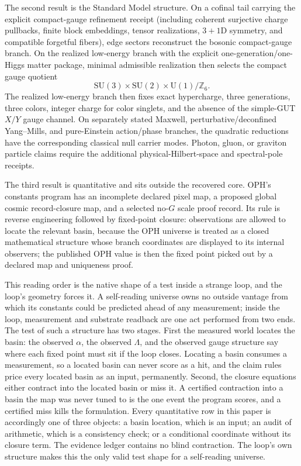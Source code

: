 \documentclass[11pt]{article}
\newcommand{\SU}{\mathrm{SU}}
\newcommand{\U}{\mathrm{U}}
\begin{document}
The second result is the Standard Model structure. On a cofinal tail carrying the explicit
compact-gauge refinement receipt (including coherent surjective charge pullbacks, finite block
embeddings, tensor realizations, \(3+1\)D symmetry, and compatible forgetful fibers), edge sectors reconstruct the
bosonic compact-gauge branch. On the realized low-energy branch with the explicit
one-generation/one-Higgs matter package, minimal admissible realization then selects the
compact gauge quotient
\[
\SU(3)\times\SU(2)\times\U(1)/\mathbb Z_6.
\]
The realized low-energy branch then fixes exact hypercharge, three generations, three colors,
integer charge for color singlets, and the absence of the simple-GUT \(X/Y\)
gauge channel. On separately
stated Maxwell, perturbative/deconfined Yang--Mills, and pure-Einstein action/phase branches, the
quadratic reductions have the corresponding classical null carrier modes. Photon, gluon, or
graviton particle claims require the additional physical-Hilbert-space and spectral-pole receipts.

The third result is quantitative and sits outside the recovered core. OPH's constants program
has an incomplete declared pixel map, a proposed global cosmic record-closure map, and a selected
no-\(G\) scale proof record. Its rule is reverse
engineering followed by fixed-point closure: observations are allowed to locate the relevant basin,
because the OPH universe is treated as a closed mathematical structure whose branch coordinates are
displayed to its internal observers; the published OPH value is then the fixed point picked
out by a declared map and uniqueness proof.

This reading order is the native shape of a test inside a strange loop, and the loop's geometry
forces it. A self-reading universe owns no outside vantage from which its constants could be
predicted ahead of any measurement; inside the loop, measurement and substrate readback are one
act performed from two ends. The test of such a structure has two stages. First the measured
world locates the basin: the observed \(\alpha\), the observed \(\Lambda\), and the observed gauge
structure say where each fixed point must sit if the loop closes. Locating a basin consumes a
measurement, so a located basin can never score as a hit, and the claim rules price every located
basin as an input, permanently. Second, the closure equations either contract into the located
basin or miss it. A certified contraction into a basin the map was never tuned to is the one
event the program scores, and a certified miss kills the formulation. Every quantitative row in
this paper is accordingly one of three objects: a basin location, which is an input; an audit of
arithmetic, which is a consistency check; or a conditional coordinate without its closure term.
The evidence ledger contains no blind contraction. The loop's own structure makes this the only
valid test shape for a self-reading universe.
\end{document}
